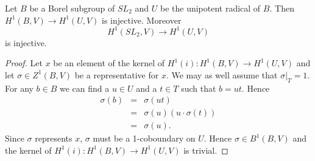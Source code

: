\begin{lemma} Let $B$ be a Borel subgroup of $SL_2$ and $U$ be the unipotent radical of $B$. Then $H^1(B, V)\rightarrow H^1(U, V)$ is injective. Moreover
\begin{displaymath}
	H^1(SL_2, V)\rightarrow H^1(U, V)
\end{displaymath}
is injective.
\end{lemma}
\begin{proof}
Let $x$ be an element of the kernel of $H^1(i):H^1(B,V)\rightarrow H^1(U,V)$ and let $\sigma \in Z^1(B,V)$ be a representative for $x$. We may as well assume that $\sigma|_T = 1$. For any $b \in B$ we can find a $u \in U$ and a $t \in T$ such that $b = ut$. Hence
\begin{eqnarray*}
	\sigma(b) &=& \sigma(ut) \\
	&=& \sigma(u) (u \cdot \sigma(t)) \\
	&=& \sigma(u).
\end{eqnarray*}
Since $\sigma$ represents $x$, $\sigma$ must be a 1-coboundary on $U$. Hence $\sigma \in B^1(B, V)$ and the kernel of $H^1(i):H^1(B,V)\rightarrow H^1(U,V)$ is trivial.
\end{proof}
